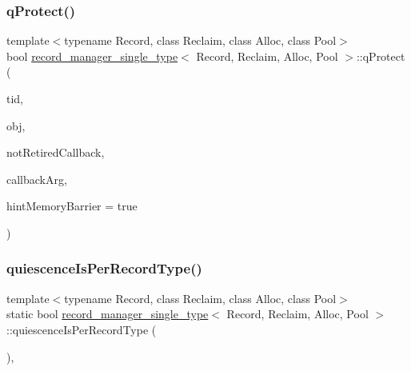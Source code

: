 \subsubsection{\texorpdfstring{q\+Protect()}{qProtect()}}
{\footnotesize\ttfamily template$<$typename Record, class Reclaim, class Alloc, class Pool$>$ \\
bool \hyperlink{classrecord__manager__single__type}{record\+\_\+manager\+\_\+single\+\_\+type}$<$ Record, Reclaim, Alloc, Pool $>$\+::q\+Protect (\begin{DoxyParamCaption}\item[{const int}]{tid,  }\item[{\hyperlink{classrecord__manager__single__type_a065f05d1a84e619758122b3da04b1327}{record\+\_\+pointer}}]{obj,  }\item[{\hyperlink{globals_8h_a57f5c0d40b156d7d996492fb2f16e3cd}{Callback\+Type}}]{not\+Retired\+Callback,  }\item[{\hyperlink{globals_8h_a3de64ef48066ac6430631c8b81a15345}{Callback\+Arg}}]{callback\+Arg,  }\item[{bool}]{hint\+Memory\+Barrier = {\ttfamily true} }\end{DoxyParamCaption})\hspace{0.3cm}{\ttfamily [inline]}}

\mbox{\label{classrecord__manager__single__type_a903370ed47527b3f97428a1f3d0b535e}} 
\subsubsection{\texorpdfstring{quiescence\+Is\+Per\+Record\+Type()}{quiescenceIsPerRecordType()}}
{\footnotesize\ttfamily template$<$typename Record, class Reclaim, class Alloc, class Pool$>$ \\
static bool \hyperlink{classrecord__manager__single__type}{record\+\_\+manager\+\_\+single\+\_\+type}$<$ Record, Reclaim, Alloc, Pool $>$\+::quiescence\+Is\+Per\+Record\+Type (\begin{DoxyParamCaption}{ }\end{DoxyParamCaption})\hspace{0.3cm}{\ttfamily [inline]}, {\ttfamily [static]}}

